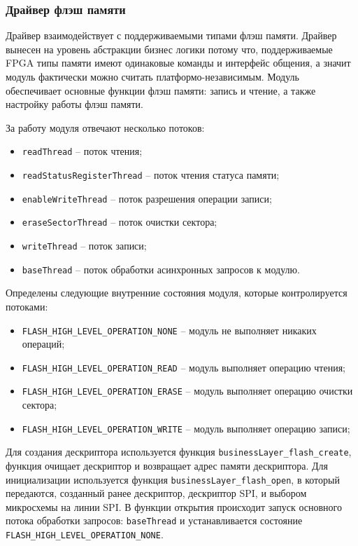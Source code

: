 \subsubsection{Драйвер флэш памяти}

Драйвер взаимодействует с поддерживаемыми типами флэш памяти. Драйвер вынесен на уровень абстракции бизнес логики потому что, поддерживаемые FPGA типы памяти имеют
одинаковые команды и интерфейс общения, а значит модуль фактически можно считать платформо-независимым. Модуль обеспечивает основные функции флэш памяти: запись и чтение,
а также настройку работы флэш памяти. 

За работу модуля отвечают несколько потоков:

\begin{itemize}
    \item \lstinline{readThread} -- поток чтения;
    \item \lstinline{readStatusRegisterThread} -- поток чтения статуса памяти;
    \item \lstinline{enableWriteThread} -- поток разрешения операции записи;
    \item \lstinline{eraseSectorThread} -- поток очистки сектора;
    \item \lstinline{writeThread} -- поток записи;
    \item \lstinline{baseThread} -- поток обработки асинхронных запросов к модулю. 
\end{itemize}

Определены следующие внутренние состояния модуля, которые контролируется потоками:

\begin{itemize}
    \item \lstinline{FLASH_HIGH_LEVEL_OPERATION_NONE} -- модуль не выполняет никаких операций;
    \item \lstinline{FLASH_HIGH_LEVEL_OPERATION_READ} -- модуль выполняет операцию чтения;
    \item \lstinline{FLASH_HIGH_LEVEL_OPERATION_ERASE} -- модуль выполняет операцию очистки сектора;
    \item \lstinline{FLASH_HIGH_LEVEL_OPERATION_WRITE} -- модуль выполняет операцию записи;
\end{itemize}

Для создания дескриптора используется функция \lstinline{businessLayer_flash_create},
функция очищает дескриптор и возвращает адрес памяти дескриптора. Для инициализации используется функция \lstinline{businessLayer_flash_open},
в который передаются, созданный ранее дескриптор, дескриптор SPI, и выбором микросхемы на линии SPI. В функции открытия происходит запуск основного потока
обработки запросов: \lstinline{baseThread} и устанавливается состояние \lstinline{FLASH_HIGH_LEVEL_OPERATION_NONE}.

